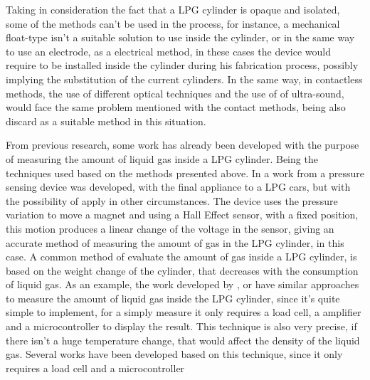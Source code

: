 Taking in consideration the fact that a LPG cylinder is opaque and isolated, some of the methods can't be used in the process, for instance, a mechanical float-type isn't a suitable solution to use inside the cylinder, or in the same way to use an electrode, as a electrical method, in these cases the device would require to be installed inside the cylinder during his fabrication process, possibly implying the substitution of the current cylinders. In the same way, in contactless methods, the use of different optical techniques and the use of of ultra-sound, would face the same problem mentioned with the contact methods, being also discard as a suitable method in this situation. 

From previous research, some work has already been developed with the purpose of measuring the amount of liquid gas inside a LPG cylinder. Being the techniques used based on the methods presented above.
In a work from \citeauthor{baigAccurateMeasurementPressure2008b} a pressure sensing device was developed, with the final appliance to a LPG cars, but with the possibility of apply in other circumstances. The device uses the pressure variation to move a magnet and using a Hall Effect sensor, with a fixed position, this motion produces a linear change of the voltage in the sensor, giving an accurate method of measuring the amount of gas in the LPG cylinder, in this case\cite{baigAccurateMeasurementPressure2008b}. 
A common method of evaluate the amount of gas inside a LPG cylinder, is based on the weight change of the cylinder, that decreases with the consumption of liquid gas. As an example, the work developed by \citeauthor{dasilvamedeirosSmartgasSmartPlatform2017a}, \citeauthor{shresthaIoTBasedSmart2019a} or \citeauthor{shinganSmartGasCylinder2017a} have similar approaches to measure the amount of liquid gas inside the LPG cylinder, since it's quite simple to implement, for a simply measure it only requires a load cell, a amplifier and a microcontroller to display the result. This technique is also very precise, if there isn't a huge temperature change, that would affect the density of the liquid gas\cite{dasilvamedeirosSmartgasSmartPlatform2017a}\cite{shresthaIoTBasedSmart2019a}\cite{shinganSmartGasCylinder2017a}.
Several works have been developed based on this technique, since it only requires a load cell and a microcontroller
